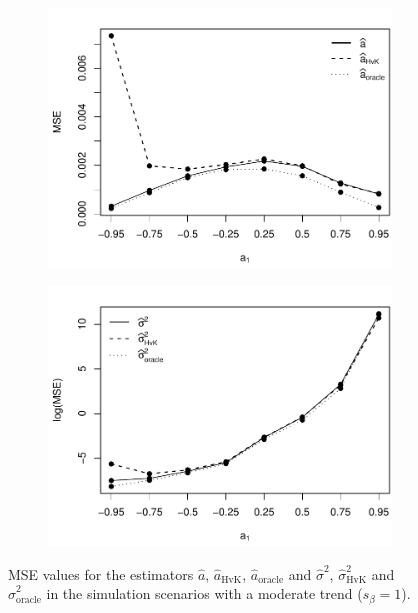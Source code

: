 \begin{figure}[t!]
\begin{subfigure}[b]{0.475\textwidth}
\includegraphics[width=\textwidth]{Plots/MSE_a1_T=500_slope=1_(q,K1,K2,M1,M2)=(25,2,10,20,30).pdf}
\end{subfigure}\hspace{0.25cm}
\begin{subfigure}[b]{0.475\textwidth}
\includegraphics[width=\textwidth]{Plots/MSE_lrv_T=500_slope=1_(q,K1,K2,M1,M2)=(25,2,10,20,30).pdf}
\end{subfigure}
\caption{MSE values for the estimators $\widehat{a}$, $\widehat{a}_{\text{HvK}}$, $\widehat{a}_{\text{oracle}}$ and $\widehat{\sigma}^2$, $\widehat{\sigma}^2_{\text{HvK}}$ and $\widehat{\sigma}^2_{\text{oracle}}$ in the simulation scenarios with a moderate trend ($s_\beta=1$).}\label{fig:MSE_slope1}
\end{figure}

